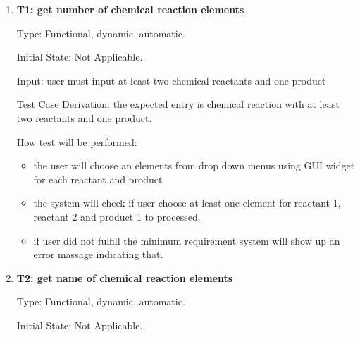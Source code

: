 \documentclass[12pt, titlepage]{article}
\begin{document}
\begin{enumerate}

\item{\bf T1: get number of chemical reaction elements \\}

Type: Functional, dynamic, automatic.
					
Initial State: Not Applicable. 
					
Input: user must input at least two chemical reactants and one product 
\begin{table}[h!]
\centering
{}
\caption{Input number of elements possible entries and its corresponding outputs }
\label{elementsnumber}
\end{table}

Test Case Derivation: the expected entry is chemical reaction with at least two reactants and one product. 

How test will be performed: 
\begin{itemize}
\item the user will choose an elements from drop down menus using GUI widget for each reactant and product
\item the system will check if user choose at least one element for reactant 1, reactant 2 and product 1 to processed. 
\item if user did not fulfill the minimum requirement system will show up an error massage indicating that. 
\end{itemize}

\item{\bf T2: get name of chemical reaction elements \\}

Type: Functional, dynamic, automatic.
					
Initial State: Not Applicable. 
					

\end{enumerate}
\end{document}
